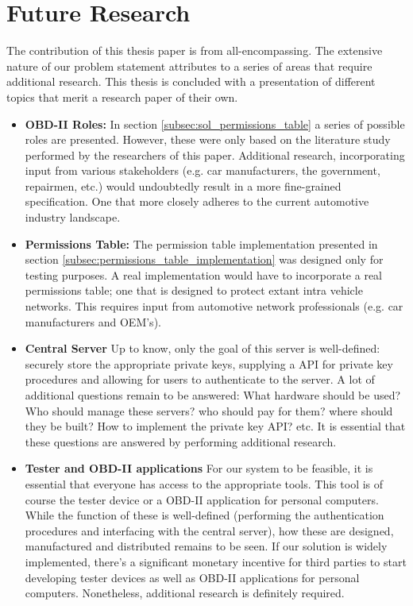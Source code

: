 \section{Future Research}
\label{sec:future_research}

The contribution of this thesis paper is from all-encompassing. The extensive nature of our problem statement attributes to a series of areas that require additional research. This thesis is concluded with a presentation of different topics that merit a research paper of their own.

\begin{itemize}
	\item \textbf{OBD-II Roles:} In section \ref{subsec:sol_permissions_table} a series of possible roles are presented. However, these were only based on the literature study performed by the researchers of this paper. Additional research, incorporating input from various stakeholders (e.g. car manufacturers, the government, repairmen, etc.) would undoubtedly result in a more fine-grained specification. One that more closely adheres to the current automotive industry landscape.
	
	\item \textbf{Permissions Table:} The permission table implementation presented in section \ref{subsec:permissions_table_implementation} was designed only for testing purposes. A real implementation would have to incorporate a real permissions table; one that is designed to protect extant intra vehicle networks. This requires input from automotive network professionals (e.g. car manufacturers and OEM's).
	
	\item \textbf{Central Server} Up to know, only the goal of this server is well-defined: securely store the appropriate private keys, supplying a API for private key procedures and allowing for users to authenticate to the server. A lot of additional questions remain to be answered: What hardware should be used? Who should manage these servers? who should pay for them? where should they be built? How to implement the private key API? etc. It is essential that these questions are answered by performing additional research.
	
	\item \textbf{Tester and OBD-II applications} For our system to be feasible, it is essential that everyone has access to the appropriate tools. This tool is of course the tester device or a OBD-II application for personal computers. While the function of these is well-defined (performing the authentication procedures and interfacing with the central server), how these are designed, manufactured and distributed remains to be seen. If our solution is widely implemented, there's a significant monetary incentive for third parties to start developing tester devices as well as OBD-II applications for personal computers. Nonetheless, additional research is definitely required.
\end{itemize}
